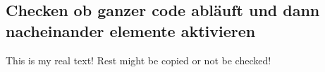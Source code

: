 \subsection{Checken ob ganzer code abläuft und dann nacheinander elemente aktivieren} \label{subsection:counter-modifications-flow}
This is my real text! Rest might be copied or not be checked!
